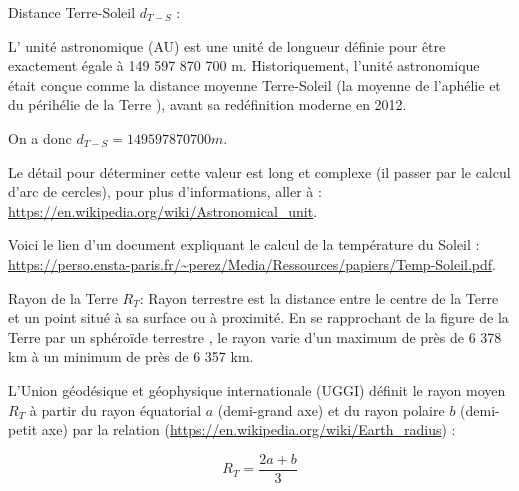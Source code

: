 \documentclass[a4paper,11pt]{article}
\begin{document}
Distance Terre-Soleil $d_{T-S}$ :

L' unité astronomique (AU) est une unité de longueur définie pour être exactement égale à 149 597 870 700 m. Historiquement, l'unité astronomique était conçue comme la distance moyenne Terre-Soleil (la moyenne de l'aphélie et du périhélie de la Terre ), avant sa redéfinition moderne en 2012. 

On a donc $d_{T-S} = 149 597 870 700 m$.

Le détail pour déterminer cette valeur est long et complexe (il passer par le calcul d'arc de cercles), pour plus d'informations, aller à : \url{https://en.wikipedia.org/wiki/Astronomical_unit}.

Voici le lien d'un document expliquant le calcul de la température du Soleil : \url{https://perso.ensta-paris.fr/~perez/Media/Ressources/papiers/Temp-Soleil.pdf}.

Rayon de la Terre $R_T$:
Rayon terrestre est la distance entre le centre de la Terre et un point situé à sa surface ou à proximité. En se rapprochant de la figure de la Terre par un sphéroïde terrestre , le rayon varie d'un maximum de près de 6 378 km à un minimum de près de 6 357 km.

L'Union géodésique et géophysique internationale (UGGI) définit le rayon moyen $R_T$ à partir du rayon équatorial $a$ (demi-grand axe) et du rayon polaire $b$ (demi-petit axe) par la relation (\url{https://en.wikipedia.org/wiki/Earth_radius}) :

\[R_T = \dfrac {2a+b}{3}\]
\end{document}
